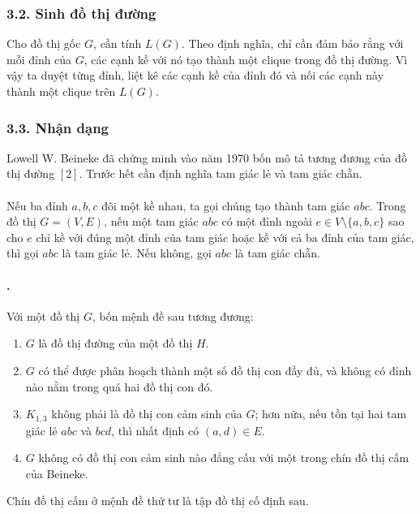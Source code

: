 \documentclass[11pt]{article}
\begin{document}
\subsubsection*{3.2. Sinh đồ thị đường}

Cho đồ thị gốc \(G\), cần tính \(L(G)\). Theo định nghĩa, chỉ cần đảm bảo rằng
với mỗi đỉnh của \(G\), các cạnh kề với nó tạo thành một clique trong đồ thị
đường. Vì vậy ta duyệt từng đỉnh, liệt kê các cạnh kề của đỉnh đó và nối các
cạnh này thành một clique trên \(L(G)\).

\subsubsection*{3.3. Nhận dạng}

Lowell W. Beineke đã chứng minh vào năm 1970 bốn mô tả tương đương của đồ thị
đường \([2]\). Trước hết cần định nghĩa tam giác lẻ và tam giác chẵn.

\paragraph{}
Nếu ba đỉnh \(a,b,c\) đôi một kề nhau, ta gọi chúng tạo thành tam giác
\(abc\). Trong đồ thị \(G=(V,E)\), nếu một tam giác \(abc\) có một đỉnh ngoài
\(e\in V\setminus\{a,b,c\}\) sao cho \(e\) chỉ kề với đúng một đỉnh của tam
giác hoặc kề với cả ba đỉnh của tam giác, thì gọi \(abc\) là tam giác lẻ. Nếu
không, gọi \(abc\) là tam giác chẵn.

\paragraph{.}
Với một đồ thị \(G\), bốn mệnh đề sau tương đương:
\begin{enumerate}
  \item \(G\) là đồ thị đường của một đồ thị \(H\).
  \item \(G\) có thể được phân hoạch thành một số đồ thị con đầy đủ, và không
  có đỉnh nào nằm trong quá hai đồ thị con đó.
  \item \(K_{1,3}\) không phải là đồ thị con cảm sinh của \(G\); hơn nữa, nếu
  tồn tại hai tam giác lẻ \(abc\) và \(bcd\), thì nhất định có \((a,d)\in E\).
  \item \(G\) không có đồ thị con cảm sinh nào đẳng cấu với một trong chín đồ
  thị cấm của Beineke.
\end{enumerate}

Chín đồ thị cấm ở mệnh đề thứ tư là tập đồ thị cố định sau.
\end{document}
